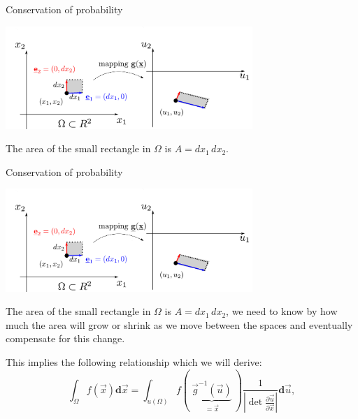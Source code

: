 \begin{frame}{Conservation of probability}

\begin{center}
\includegraphics[width=0.7\textwidth]{img/u}
\end{center}

The area of the small rectangle in $\Omega$ is $A = dx_1\, dx_2$.\\

\end{frame}


\begin{frame}{Conservation of probability}

\begin{center}
\includegraphics[width=0.7\textwidth]{img/u}
\end{center}

The area of the small rectangle in $\Omega$ is $A = dx_1\, dx_2$, we need to know by how much the area will grow or shrink as we move between the spaces and eventually compensate for this change.

\pause

This implies the following relationship which we will derive:
\begin{equation}
\int_{\Omega} f(\vec{x}) \mathbf{d}\vec{x}
=\int_{u(\Omega)} f(~\underbrace{\vec g^{-1}(\vec u)}_{= \vec x}~) \frac{1}{\left|\det \frac{\partial \vec{u}}{\partial \vec{x}} \right|} \mathbf{d}\vec{u},
\end{equation}



\end{frame}

